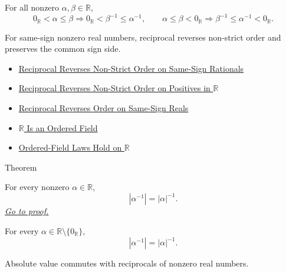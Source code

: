 \begin{remark*}
For all nonzero $\alpha,\beta\in\mathbb{R}$,
\[
0_{\mathbb{R}}<\alpha\le\beta
\Longrightarrow
0_{\mathbb{R}}<\beta^{-1}\le\alpha^{-1},
\qquad
\alpha\le\beta<0_{\mathbb{R}}
\Longrightarrow
\beta^{-1}\le\alpha^{-1}<0_{\mathbb{R}}.
\]
\end{remark*}

\begin{remark*}[Interpretation]
For same-sign nonzero real numbers, reciprocal reverses non-strict order and
preserves the common sign side.
\end{remark*}

\begin{dependencies}
\begin{itemize}
  \item \hyperref[thm:reciprocal-reverses-nonstrict-order-on-same-sign-q]{Reciprocal Reverses Non-Strict Order on Same-Sign Rationals}
  \item \hyperref[thm:reciprocal-reverses-nonstrict-order-on-positives-r]{Reciprocal Reverses Non-Strict Order on Positives in $\mathbb{R}$}
  \item \hyperref[thm:reciprocal-reverses-order-on-same-sign-r]{Reciprocal Reverses Order on Same-Sign Reals}
  \item \hyperref[thm:r-is-an-ordered-field]{$\mathbb{R}$ Is an Ordered Field}
  \item \hyperref[cor:ordered-field-laws-on-r]{Ordered-Field Laws Hold on $\mathbb{R}$}
\end{itemize}
\end{dependencies}

\begin{theorembox}{Theorem}
\begin{theorem}
\label{thm:absolute-value-of-reciprocal-r}
For every nonzero $\alpha\in\mathbb{R}$,
\[
|\alpha^{-1}|=|\alpha|^{-1}.
\]
\hyperref[prf:absolute-value-of-reciprocal-r]{\textit{Go to proof.}}
\end{theorem}
\end{theorembox}

\begin{remark*}
For every $\alpha\in\mathbb{R}\setminus\{0_{\mathbb{R}}\}$,
\[
|\alpha^{-1}|=|\alpha|^{-1}.
\]
\end{remark*}

\begin{remark*}[Interpretation]
Absolute value commutes with reciprocals of nonzero real numbers.
\end{remark*}


